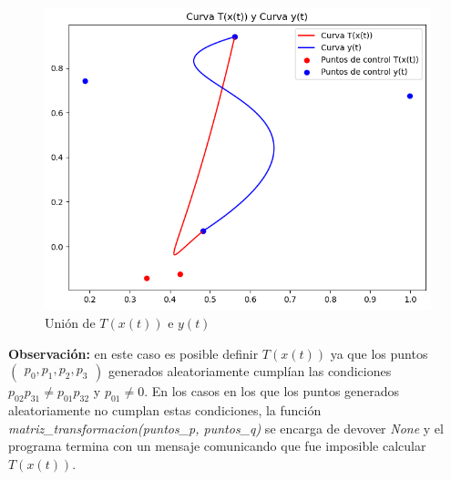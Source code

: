 \documentclass{article}
\begin{document}
\begin{figure}[H]
\begin{minipage}{0.45\textwidth}
        \label{fig:grafico2}
    \end{minipage}
\begin{minipage}{0.45\textwidth}
        \centering
        \includegraphics[width=\textwidth]{imagenes/6d.png}
        \caption{Unión de $T(x(t))$ e $y(t)$}
        \label{fig:grafico2}
    \end{minipage}
    \label{fig:dos_graficos}
\end{figure}

\textbf {Observación:} en este caso es posible definir $T(x(t))$ ya que los puntos $\begin{pmatrix}p_0, p_1, p_2, p_3 \end{pmatrix}$ generados aleatoriamente cumplían las condiciones  $p_{02}p_{31} \neq p_{01}p_{32}$ y $p_{01} \neq 0$. En los casos en los que los puntos generados aleatoriamente no cumplan estas condiciones, la función \textit{matriz\_transformacion(puntos\_p, puntos\_q)} se encarga de devover \textit{None} y el programa termina con un mensaje comunicando que fue imposible calcular $T(x(t))$.
\end{document}
